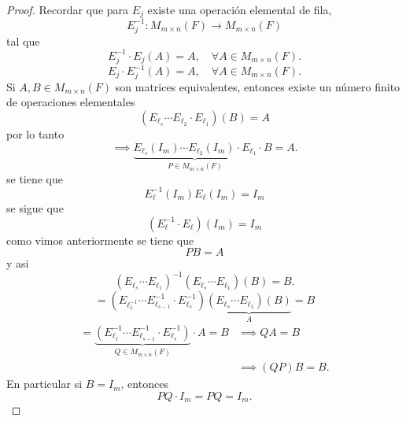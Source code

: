 \documentclass[12pt,a4paper]{book}
\begin{document}
    \begin{proof}
        Recordar que para $E_{j}$ existe una operación elemental de fila,
        \begin{equation*}
            E^{-1}_{j}:M_{m\times n}(F)\to M_{m\times n}(F)
        \end{equation*}
        tal que
        \begin{equation*}
            E_{j}^{-1}\cdot E_{j}(A)=A,\quad\forall A\in M_{m\times n}(F).
        \end{equation*}
        \begin{equation*}
            E_{j}\cdot E_{j}^{-1}(A)=A,\quad\forall A\in M_{m\times n}(F).
        \end{equation*}
        Si $A,B\in M_{m\times n}(F)$ son matrices equivalentes, entonces existe un número finito
        de operaciones elementales
        \begin{equation*}
            (E_{\ell_{s}}\cdots E_{\ell_{2}}\cdot E_{\ell_{1}})(B)=A
        \end{equation*}
        por lo tanto
        \begin{equation*}
            \implies\underbrace{E_{\ell_{s}}(I_{m})\cdots E_{\ell_{2}}(I_{m})\cdot E_{\ell_{1}}}_{P\in M_{m\times n}(F)}\cdot B=A.
        \end{equation*}
        se tiene que
        \begin{equation*}
            E_{\ell}^{-1}(I_{m})E_{\ell}(I_{m})=I_{m}
        \end{equation*}
        se sigue que
        \begin{equation*}
            (E_{\ell}^{-1}\cdot E_{\ell})(I_{m})=I_{m}
        \end{equation*}
        como vimos anteriormente se tiene que
        \begin{equation*}
            PB=A
        \end{equation*}
        y asi
        \begin{equation*}
            (E_{\ell_{s}}\cdots E_{\ell_{1}})^{-1}(E_{\ell_{s}}\cdots E_{\ell_{1}})(B)=B.
        \end{equation*}
        \begin{equation*}
            =(E_{\ell_{1}^{-1}}\cdots E_{\ell_{s-1}}^{-1}\cdot E_{\ell_{s}}^{-1})\underbrace{(E_{\ell_{s}}\cdots E_{\ell_{1}})(B)}_{A}=B
        \end{equation*}
        \begin{align*}
            =\underbrace{(E_{\ell_{1}}^{-1}\cdots E_{\ell_{s-1}}^{-1}\cdot E_{\ell_{s}}^{-1})}_{Q\in M_{m\times n}(F)}\cdot A=B&\implies QA=B\\
            &\implies (QP)B=B.
        \end{align*}
        En particular si $B=I_{m}$, entonces
        \begin{equation*}
            PQ\cdot I_{m}=PQ=I_{m}.
        \end{equation*}
    \end{proof}
\end{document}
